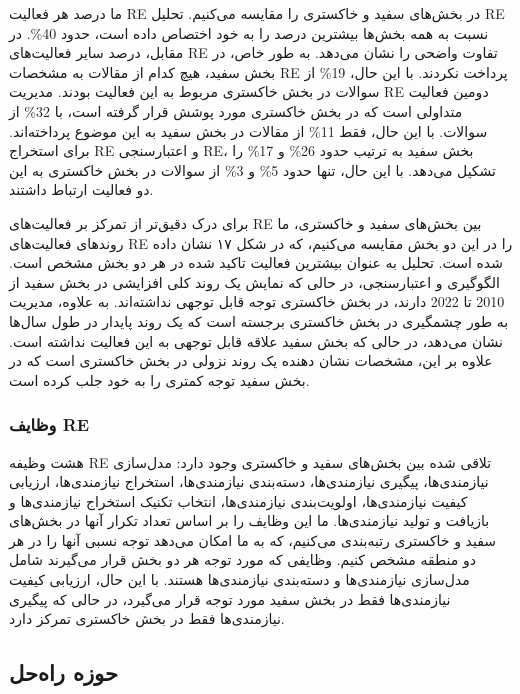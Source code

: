 \documentclass[a4paper,10pt]{article}
\begin{document}
                ما درصد هر فعالیت RE در بخش‌های سفید و خاکستری را مقایسه می‌کنیم. تحلیل RE نسبت به همه بخش‌ها بیشترین درصد را به خود اختصاص داده است، حدود 40\%. در مقابل، درصد سایر فعالیت‌های RE تفاوت واضحی را نشان می‌دهد. به طور خاص، در بخش سفید، هیچ کدام از مقالات به مشخصات RE پرداخت نکردند. با این حال، 19\% از سوالات در بخش خاکستری مربوط به این فعالیت بودند. مدیریت RE دومین فعالیت متداولی است که در بخش خاکستری مورد پوشش قرار گرفته است، با 32\% از سوالات. با این حال، فقط 11\% از مقالات در بخش سفید به این موضوع پرداخته‌اند. برای استخراج RE و اعتبارسنجی RE، بخش سفید به ترتیب حدود 26\% و 17\% را تشکیل می‌دهد. با این حال، تنها حدود 5\% و 3\% از سوالات در بخش خاکستری به این دو فعالیت ارتباط داشتند.

                برای درک دقیق‌تر از تمرکز بر فعالیت‌های RE بین بخش‌های سفید و خاکستری، ما روندهای فعالیت‌های RE را در این دو بخش مقایسه می‌کنیم، که در شکل ۱۷ نشان داده شده است. تحلیل به عنوان بیشترین فعالیت تاکید شده در هر دو بخش مشخص است. الگوگیری و اعتبارسنجی، در حالی که نمایش یک روند کلی افزایشی در بخش سفید از 2010 تا 2022 دارند، در بخش خاکستری توجه قابل توجهی نداشته‌اند. به علاوه، مدیریت به طور چشمگیری در بخش خاکستری برجسته است که یک روند پایدار در طول سال‌ها نشان می‌دهد، در حالی که بخش سفید علاقه قابل توجهی به این فعالیت نداشته است. علاوه بر این، مشخصات نشان دهنده یک روند نزولی در بخش خاکستری است که در بخش سفید توجه کمتری را به خود جلب کرده است.

                \subsubsection{وظایف RE}

                    هشت وظیفه RE تلاقی شده بین بخش‌های سفید و خاکستری وجود دارد: مدل‌سازی نیازمندی‌ها، پیگیری نیازمندی‌ها، دسته‌بندی نیازمندی‌ها، استخراج نیازمندی‌ها، ارزیابی کیفیت نیازمندی‌ها، اولویت‌بندی نیازمندی‌ها، انتخاب تکنیک استخراج نیازمندی‌ها و بازیافت و تولید نیازمندی‌ها. ما این وظایف را بر اساس تعداد تکرار آنها در بخش‌های سفید و خاکستری رتبه‌بندی می‌کنیم، که به ما امکان می‌دهد توجه نسبی آنها را در هر دو منطقه مشخص کنیم. وظایفی که مورد توجه هر دو بخش قرار می‌گیرند شامل مدل‌سازی نیازمندی‌ها و دسته‌بندی نیازمندی‌ها هستند. با این حال، ارزیابی کیفیت نیازمندی‌ها فقط در بخش سفید مورد توجه قرار می‌گیرد، در حالی که پیگیری نیازمندی‌ها فقط در بخش خاکستری تمرکز دارد.

            \subsection{حوزه راه‌حل}
\end{document}

